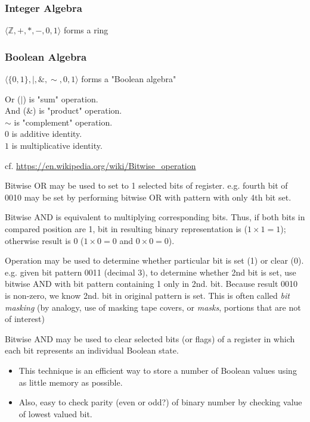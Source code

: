 \documentclass[10pt]{amsart}
\begin{document}
\begin{multicols*}{2}
\subsubsection{Integer Algebra}

$\langle \mathbb{Z}, +, *, - , 0 , 1 \rangle$ forms a ring

\subsubsection{Boolean Algebra}

$\langle \lbrace 0, 1 \rbrace , |, \& , \sim, 0, 1 \rangle $ forms a "Boolean algebra"

Or ($|$) is "sum" operation. \\
And ($\&$) is "product" operation. \\
$\sim$ is "complement" operation. \\
$0$ is additive identity. \\
$1$ is multiplicative identity.

cf. \url{https://en.wikipedia.org/wiki/Bitwise_operation}

Bitwise OR may be used to set to 1 selected bits of register. e.g. fourth bit of 0010 may be set by performing bitwise OR with pattern with only 4th bit set.

Bitwise AND is equivalent to multiplying corresponding bits. Thus, if both bits in compared position are 1, bit in resulting binary representation is ($1 \times 1 = 1$); otherwise result is 0 ($1 \times 0 = 0$ and $0 \times 0 = 0$).

Operation may be used to determine whether particular bit is set (1) or clear (0). e.g. given bit pattern 0011 (decimal 3), to determine whether 2nd bit is set, use bitwise AND with bit pattern containing 1 only in 2nd. bit. Because result 0010 is non-zero, we know 2nd. bit in original pattern is set. This is often called \emph{bit masking} (by analogy, use of masking tape covers, or \emph{masks}, portions that are not of interest)

Bitwise AND may be used to clear selected bits (or flags) of a register in which each bit represents an individual Boolean state.
\begin{itemize}
	\item This technique is an efficient way to store a number of Boolean values using as little memory as possible.
	\item Also, easy to check parity (even or odd?) of binary number by checking value of lowest valued bit.
\end{itemize}


\end{multicols*}
\end{document}
